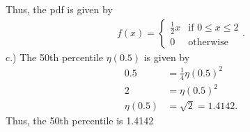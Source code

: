 \documentclass{report}
\begin{document}
 \bigbreak \noindent
 Thus, the pdf is given by
 \begin{align*}
     f(x) =
     \begin{cases}
         \frac{1}{2}x & \text{if } 0 \leq x \leq 2 \\
         0 & \text{otherwise}
        \end{cases}
 .\end{align*}
 \bigbreak \noindent 
 c.) The 50th percentile $\eta(0.5)$ is given by
 \begin{align*}
     0.5 &= \frac{1}{4}\eta(0.5)^{2} \\
     2&=\eta(0.5)^{2} \\
     \eta(0.5) &= \sqrt{2} = 1.4142
 .\end{align*}
 \bigbreak \noindent 
 Thus, the 50th percentile is 1.4142


 
\end{document}
